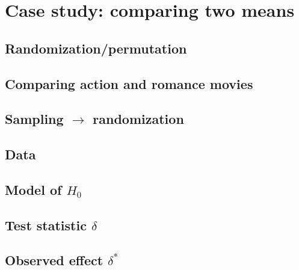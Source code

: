 \documentclass[12pt, krantz2,]{krantz}
\begin{document}
\hypertarget{ht-case-study}{%
\section{Case study: comparing two means}\label{ht-case-study}}

\hypertarget{randomizationpermutation}{%
\subsection{Randomization/permutation}\label{randomizationpermutation}}

\hypertarget{comparing-action-and-romance-movies}{%
\subsection{Comparing action and romance movies}\label{comparing-action-and-romance-movies}}

\hypertarget{sampling-rightarrow-randomization}{%
\subsection{\texorpdfstring{Sampling \(\rightarrow\) randomization}{Sampling \textbackslash{}rightarrow randomization}}\label{sampling-rightarrow-randomization}}

\hypertarget{data}{%
\subsection{Data}\label{data}}

\hypertarget{model-of-h_0}{%
\subsection{\texorpdfstring{Model of \(H_0\)}{Model of H\_0}}\label{model-of-h_0}}

\hypertarget{test-statistic-delta}{%
\subsection{\texorpdfstring{Test statistic \(\delta\)}{Test statistic \textbackslash{}delta}}\label{test-statistic-delta}}

\hypertarget{observed-effect-delta}{%
\subsection{\texorpdfstring{Observed effect \(\delta^*\)}{Observed effect \textbackslash{}delta\^{}*}}\label{observed-effect-delta}}
\end{document}
